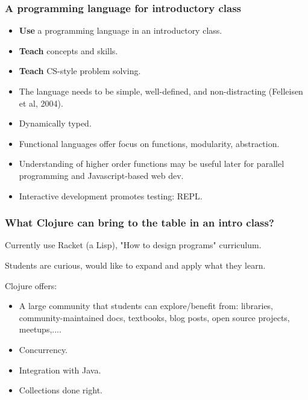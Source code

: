 \documentclass{beamer}
\begin{document}
\begin{frame}
   \frametitle{A programming language for introductory class}
\begin{itemize}
\item {\bf Use} a programming language in an introductory class.
\item <2->{\bf  Teach} concepts and skills.
\item <3-> {\bf  Teach} CS-style problem solving.
\item <4->The language needs to be simple, well-defined, and non-distracting (Felleisen et al, 2004).
\item <5->Dynamically typed.
\item <6-> Functional languages offer focus on functions, modularity, abstraction.
\item <7-> Understanding of higher order functions may be useful later for parallel programming and Javascript-based web dev. 
\item <8-> Interactive development promotes testing: REPL. 
\end{itemize}
\end{frame}

\begin{frame}
   \frametitle{What Clojure can bring to the table in an intro class?}
Currently use Racket (a Lisp), "How to design programs" curriculum.

Students are curious, would like to expand and apply what they learn. 

Clojure offers:
\begin{itemize}
\item A large community that students can explore/benefit from: libraries, community-maintained docs, textbooks, blog posts, open source projects, meetups,....
\item Concurrency.
\item Integration with Java. 
\item Collections done right. 
\end{itemize}
\end{frame}

\end{document}
